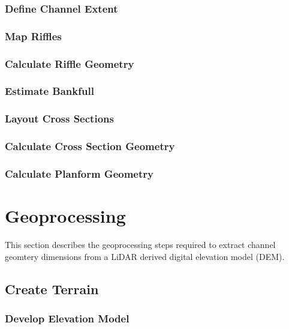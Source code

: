 \documentclass[]{book}
\theoremstyle{definition}
\theoremstyle{definition}
\theoremstyle{definition}
\theoremstyle{remark}
\begin{document}
\subsection{Define Channel Extent}\label{define-channel-extent}

\subsection{Map Riffles}\label{map-riffles}

\subsection{Calculate Riffle Geometry}\label{calculate-riffle-geometry}

\subsection{Estimate Bankfull}\label{estimate-bankfull}

\subsection{Layout Cross Sections}\label{layout-cross-sections}

\subsection{Calculate Cross Section
Geometry}\label{calculate-cross-section-geometry}

\subsection{Calculate Planform
Geometry}\label{calculate-planform-geometry}

\chapter{Geoprocessing}\label{geoprocessing}

This section describes the geoprocessing steps required to extract
channel geomtery dimensions from a LiDAR derived digital elevation model
(DEM).

\section{Create Terrain}\label{create-terrain-1}

\subsection{Develop Elevation Model}\label{develop-elevation-model}
\end{document}

